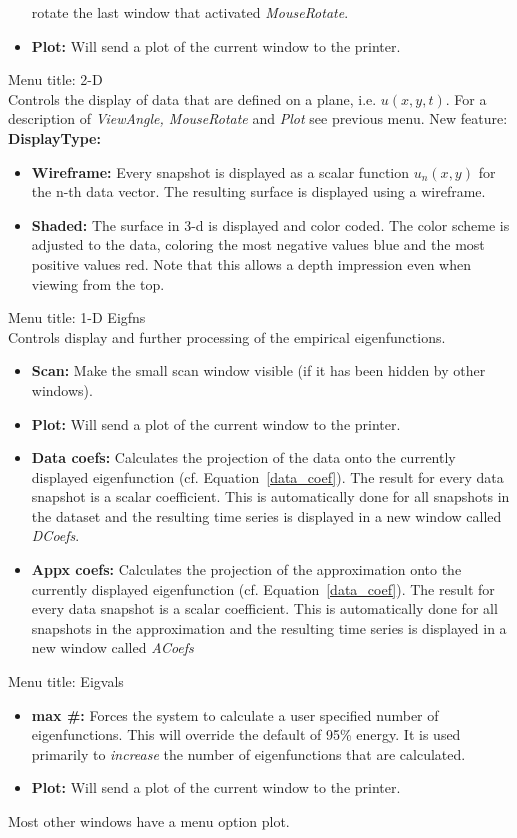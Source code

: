 \begin{description}
\begin{itemize}
	rotate the last window that activated {\sl MouseRotate}.
\item{\bf Plot:}  Will send a plot of the current window to the printer.
\end{itemize}
\item{Menu title: {\large  2-D}}\\
Controls the display of data that are defined on a plane, i.e. $u(x,y,t)$.
For a description of {\sl ViewAngle, MouseRotate} and {\sl Plot} see
previous menu. New feature:\\
{\bf DisplayType:}  
\begin{itemize}
	\item{\bf Wireframe:}  Every snapshot is displayed as a scalar function
	$u_n(x,y)$ for the n-th data vector. The resulting surface is 
	displayed using a wireframe.
	\item{\bf Shaded:}  The surface in 3-d is displayed and color coded.
	The color
	scheme is adjusted to the data, coloring the most negative values
	blue and the most positive values red. Note that this allows a depth
	impression even when viewing from the top.
\end{itemize}

\item{Menu title: {\large  1-D Eigfns}}\\
Controls display and further processing of the empirical eigenfunctions.
\begin{itemize}
\item{\bf Scan:}  Make the small scan window visible (if it has been hidden by
	other windows).
\item{\bf Plot:}  Will send a plot of the current window to the printer.
\item{\bf Data coefs:} 
	Calculates the projection of the data onto the currently displayed
	eigenfunction (cf. Equation~\ref{data_coef}). The result for every data
	snapshot is a scalar coefficient. This is automatically done for all
	snapshots in the dataset and the resulting time series is displayed in a
	new window called {\sl DCoefs}.
\item{\bf Appx coefs:} 
	Calculates the projection of the approximation onto the currently
	displayed eigenfunction (cf. Equation~\ref{data_coef}). The result for
	every data snapshot is a scalar coefficient. This is automatically done
	for all snapshots in the approximation and the resulting time series is
	displayed in a new window called {\sl ACoefs}
\end{itemize}
\item{Menu title: {\large  Eigvals}}
\begin{itemize}
\item{\bf max \#:}  Forces the system to calculate a user specified number of
	eigenfunctions. This will override the default of 95\% energy.
	It is used primarily to {\em increase} the number of eigenfunctions
	that are calculated. 
\item{\bf Plot:}  Will send a plot of the current window to the printer.
\end{itemize}	
Most other windows have a menu option plot. 
\end{description}
